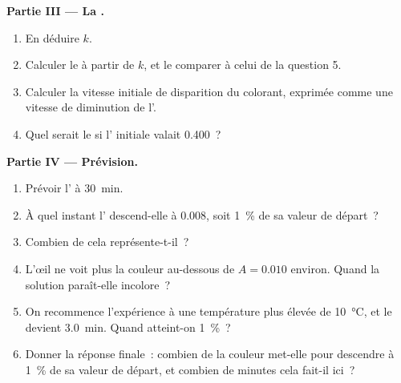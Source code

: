 \begin{problem}
\medskip
\noindent\textbf{Partie III --- La .}
\begin{enumerate}[resume]
  \item En déduire $k$.
  \item Calculer le  à partir de $k$, et le
        comparer à celui de la question 5.
  \item Calculer la vitesse initiale de disparition du colorant,
        exprimée comme une vitesse de diminution de l'.
  \item Quel serait le  si l' initiale
        valait 0.400~?
\end{enumerate}

\medskip
\noindent\textbf{Partie IV --- Prévision.}
\begin{enumerate}[resume]
  \item Prévoir l' à \qty{30}{min}.
  \item À quel instant l' descend-elle à 0.008, soit
        \qty{1}{\percent} de sa valeur de départ~?
  \item Combien de  cela représente-t-il~?
  \item L'œil ne voit plus la couleur au-dessous de $A = 0.010$
        environ. Quand la solution paraît-elle incolore~?
  \item On recommence l'expérience à une température plus élevée de
        \qty{10}{\celsius}, et le  devient
        \qty{3.0}{min}. Quand atteint-on \qty{1}{\percent}~?
  \item Donner la réponse finale~: combien de  la
        couleur met-elle pour descendre à \qty{1}{\percent} de sa valeur
        de départ, et combien de minutes cela fait-il ici~?
\end{enumerate}
\end{problem}
